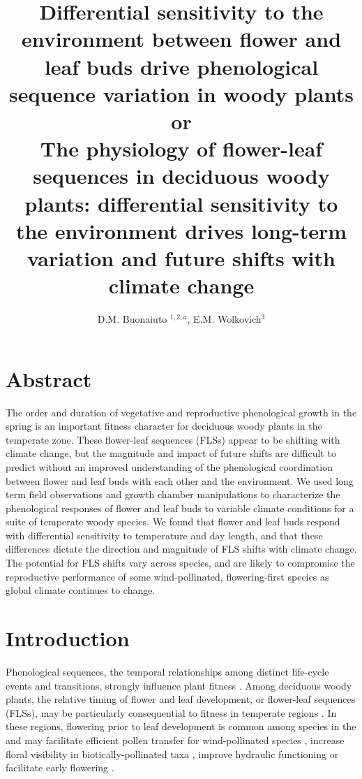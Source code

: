\documentclass[11pt]{article}
\title{Differential sensitivity to the environment between flower and leaf buds drive phenological sequence variation in woody plants\\
or\\
The physiology of flower-leaf sequences in deciduous woody plants: differential sensitivity to the environment drives long-term variation and future shifts with climate change}
\date{}
\author{D.M. Buonaiuto $^{1,2,a}$, E.M. Wolkovich$^{3}$}
\begin{document}
\maketitle
\section*{Abstract}
The order and duration of vegetative and reproductive phenological growth in the spring is an important fitness character for deciduous woody plants in the temperate zone. These flower-leaf sequences (FLSs) appear to be shifting with climate change, but the magnitude and impact of future shifts are difficult to predict without an improved understanding of the phenological coordination between flower and leaf buds with each other and the environment. We used long term field observations and growth chamber manipulations to characterize the phenological responses of flower and leaf buds to variable climate conditions for a suite of temperate woody species. We found that flower and leaf buds respond with differential sensitivity to temperature and day length, and that these differences dictate the direction and magnitude of FLS shifts with climate change. The potential for FLS shifts vary across species, and are likely to compromise the reproductive performance of some wind-pollinated, flowering-first species as global climate continues to change.  %


\section*{Introduction}
\noindent  Phenological sequences, the temporal relationships among distinct life-cycle events and transitions, strongly influence plant fitness \citep{Ettinger2018,Savage2019,Chamberlin}. Among deciduous woody plants, the relative timing of flower and leaf development, or flower-leaf sequences (FLSs), may be particularly consequential to fitness in temperate regions \citep{Gougherty2018}. In these regions, flowering prior to leaf development is common among species in the and may facilitate efficient pollen transfer for wind-pollinated species \citep{Rathcke_1985}, increase floral visibility in biotically-pollinated taxa \citep{Janzen1967}, improve hydraulic functioning \citep{Gougherty2018,Reich1984} or facilitate early flowering \citep{Primack1987}.\\
\end{document}
